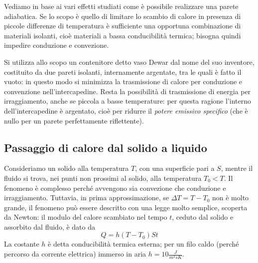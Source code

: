 \documentclass[class=book, crop=false, oneside, 12pt]{standalone}
\begin{document}
Vediamo in base ai vari effetti studiati come è possibile realizzare una parete adiabatica. 
Se lo scopo è quello di limitare lo scambio di calore in presenza di piccole differenze di temperatura è sufficiente una opportuna combinazione di materiali isolanti, cioè materiali a bassa conducibilità termica; bisogna quindi impedire conduzione e convezione. 

Si utilizza allo scopo un contenitore detto vaso Dewar dal nome del suo inventore, costituito da due pareti isolanti, internamente argentate, tra le quali è fatto il vuoto: in questo modo si minimizza la trasmissione di calore per conduzione e convenzione nell'intercapedine. 
Resta la possibilità di trasmissione di energia per irraggiamento, anche se piccola a basse temperature: per questa ragione l'interno dell'intercapedine è argentato, cioè per ridurre il \emph{potere emissivo specifico} (che è nullo per un parete perfettamente riflettente). 

\subsection{Passaggio di calore dal solido a liquido}

Consideriamo un solido alla temperatura \(T\), con una superficie pari a \(S\), mentre il fluido si trova, nei punti non prossimi al solido, alla temperatura \(T_0 < T\). 
Il fenomeno è complesso perché avvengono sia convezione che conduzione e irraggiamento. 
Tuttavia, in prima approssimazione, se \(\Delta T = T - T_0 \) non è molto grande, il fenomeno può essere descritto con una legge molto semplice, scoperta da Newton: il modulo del calore scambiato nel tempo \(t\), ceduto dal solido e assorbito dal fluido, è dato da
\begin{equation}
    Q = h (T-T_0) S t
\end{equation}
La costante \(h\) è detta conducibilità termica esterna; per un filo caldo (perché percorso da corrente elettrica) immerso in aria \(h = 10 \frac{J}{m^2 s K}\). 
\end{document}
